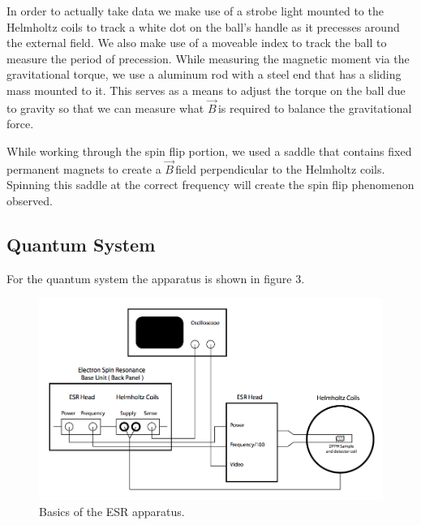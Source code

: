 \documentclass{article}
\newcommand{\B}{$\vec{B}\,$}
\begin{document}
	\vspace{.25cm}

	In order to actually take data we make use of a strobe light mounted to the Helmholtz coils to track a white dot on the ball's handle as it precesses around the external field.  We also make use of a moveable index to track the ball to measure the period of precession.  While measuring the magnetic moment via the gravitational torque, we use a aluminum rod with a steel end that has a sliding mass mounted to it.  This serves as a means to adjust the torque on the ball due to gravity so that we can measure what \B is required to balance the gravitational force.

	While working through the spin flip portion, we used a saddle that contains fixed permanent magnets to create a \B field perpendicular to the Helmholtz coils.  Spinning this saddle at the correct frequency will create the spin flip phenomenon observed.

	\subsection{Quantum System}
	For the quantum system the apparatus is shown in figure 3.

	\vspace{.25cm}

	\begin{figure}[!htb]
		\centering
		\includegraphics[scale=.5]{esr_connections.png}
		\caption{Basics of the ESR apparatus.}
	\end{figure}
\end{document}
